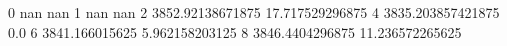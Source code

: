 0 nan nan
1 nan nan
2 3852.92138671875 17.717529296875
4 3835.203857421875 0.0
6 3841.166015625 5.962158203125
8 3846.4404296875 11.236572265625
